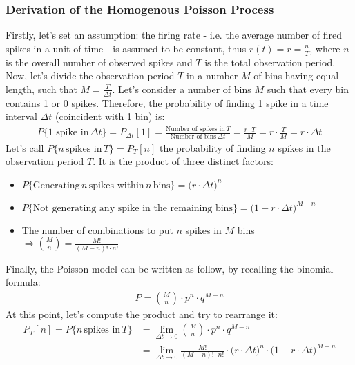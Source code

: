 \subsubsection{Derivation of the Homogenous Poisson Process}
Firstly, let's set an assumption: the firing rate - i.e. the average number
of fired spikes in a unit of time - is assumed to be constant, thus
\(r(t)=r=\frac{n}{T}\), where \(n\) is the overall number of observed spikes
and \(T\) is the total observation period.\\
Now, let's divide the observation period \(T\) in a number \(M\) of bins having
equal length, such that \(M=\frac{T}{\Delta{t}}\). Let's consider a
number of bins \(M\) such that every bin contains 1 or 0 spikes. Therefore,
the probability of finding 1 spike in a time interval \(\Delta{t}\) (coincident
with 1 bin) is:
\begin{align*}
    P\{\text{1 spike in}\,\Delta{t}\}=P_{\Delta{t}}[1]
    =\frac{\text{Number of spikes in}\,T}{\text{Number of bins}\,\Delta{t}}
    =\frac{r\cdot{T}}{M}
    =r\cdot\frac{T}{M}
    =r\cdot{\Delta{t}}
\end{align*}
Let's call \(P\{n\,\text{spikes in}\,T\}=P_T[n]\) the probability of finding \(n\)
spikes in the observation period \(T\). It is the product of three distinct factors:
\begin{itemize}
    \item \(P\{\text{Generating}\,n\,\text{spikes within}\,n\,\text{bins}\}
          =\bigl(r\cdot{\Delta{t}}\bigr)^n\)
    \item \(P\{\text{Not generating any spike in the remaining bins}\}
          =\bigl(1-r\cdot{\Delta{t}}\bigr)^{M-n}\)
    \item The number of combinations to put \(n\) spikes in \(M\) bins
          \(\Rightarrow\binom{M}{n}=\frac{M!}{(M-n)!\cdot{n!}}\)
\end{itemize}
Finally, the Poisson model can be written as follow, by recalling the binomial formula:
\begin{align*}
    P=\binom{M}{n}\cdot{p^n}\cdot{q^{M-n}}
\end{align*}
At this point, let's compute the product and try to rearrange it:
\begin{align*}
    P_T[n]=P\{n\,\text{spikes in}\,T\}
     & =\lim_{\Delta{t}\to{0}}\binom{M}{n}\cdot{p^n}\cdot{q^{M-n}}                                                                         \\
     & =\lim_{\Delta{t}\to{0}}\frac{M!}{(M-n)!\cdot{n!}}\cdot{\bigl(r\cdot{\Delta{t}}\bigr)^n}\cdot{\bigl(1-r\cdot{\Delta{t}}\bigr)^{M-n}}
\end{align*}
